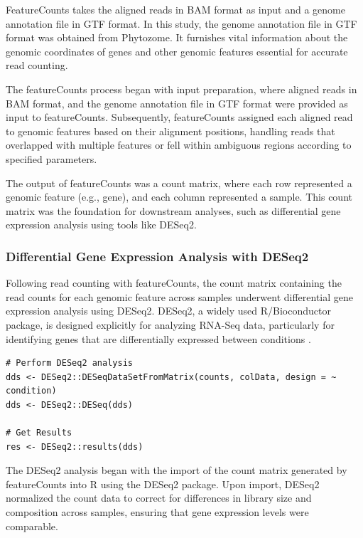 \documentclass[12pt,letterpaper]{article}
\begin{document}
FeatureCounts takes the aligned reads in BAM format as input and a genome annotation file in GTF format. In this study, the genome annotation file in GTF format was obtained from Phytozome. It furnishes vital information about the genomic coordinates of genes and other genomic features essential for accurate read counting.

The featureCounts process began with input preparation, where aligned reads in BAM format, and the genome annotation file in GTF format were provided as input to featureCounts. Subsequently, featureCounts assigned each aligned read to genomic features based on their alignment positions, handling reads that overlapped with multiple features or fell within ambiguous regions according to specified parameters.

The output of featureCounts was a count matrix, where each row represented a genomic feature (e.g., gene), and each column represented a sample. This count matrix was the foundation for downstream analyses, such as differential gene expression analysis using tools like DESeq2.


\subsubsection{Differential Gene Expression Analysis with DESeq2}
Following read counting with featureCounts, the count matrix containing the read counts for each genomic feature across samples underwent differential gene expression analysis using DESeq2. DESeq2, a widely used R/Bioconductor package, is designed explicitly for analyzing RNA-Seq data, particularly for identifying genes that are differentially expressed between conditions \parencite{deseq2}.

\begin{lstlisting}[caption={Example R Code for Differential Gene Expression Analysis with DESeq2.},captionpos=b]
# Perform DESeq2 analysis
dds <- DESeq2::DESeqDataSetFromMatrix(counts, colData, design = ~ condition)
dds <- DESeq2::DESeq(dds)

# Get Results
res <- DESeq2::results(dds)
\end{lstlisting}

The DESeq2 analysis began with the import of the count matrix generated by featureCounts into R using the DESeq2 package. Upon import, DESeq2 normalized the count data to correct for differences in library size and composition across samples, ensuring that gene expression levels were comparable.
\end{document}
